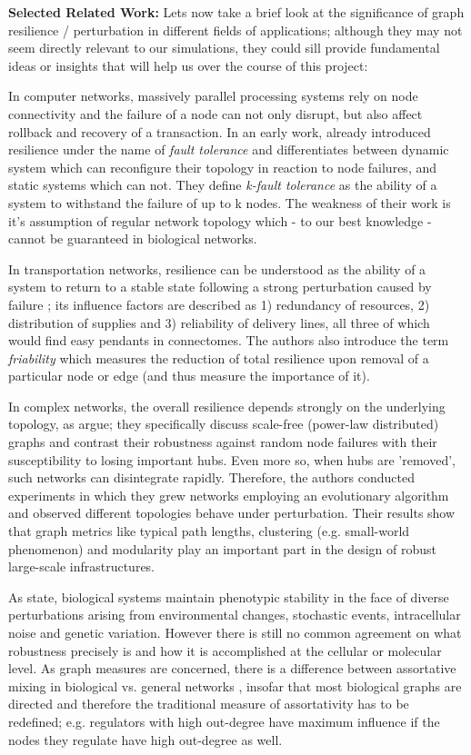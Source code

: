 \documentclass[a4paper,11pt]{article}
\begin{document}
\textbf{Selected Related Work:} Lets now take a brief look at the significance of graph resilience / perturbation in different fields of applications; although they may not seem directly relevant to our simulations, they could sill provide fundamental ideas or insights that will help us over the course of this project:

In computer networks, massively parallel processing systems rely on node connectivity and the failure of a node can not only disrupt, but also affect rollback and recovery of a transaction. In an early work, \citep{Gaudiot1990NetworkResilience} already introduced resilience under the name of \emph{fault tolerance} and differentiates between dynamic system which can reconfigure their topology in reaction to node failures, and static systems which can not. They define \emph{k-fault tolerance} as the ability of a system to withstand the failure of up to k nodes. The weakness of their work is it's assumption of regular network topology which - to our best knowledge - cannot be guaranteed in biological networks.

In transportation networks, resilience can be understood as the ability of a system to return to a stable state following a strong perturbation caused by failure \citep{Ip2011ResilienceTransportationNetworks}; its influence factors are described as 1) redundancy of resources, 2) distribution of supplies and 3) reliability of delivery lines, all three of which would find easy pendants in connectomes. The authors also introduce the term \emph{friability} which measures the reduction of total resilience upon removal of a particular node or edge (and thus measure the importance of it).

In complex networks, the overall resilience depends strongly on the underlying topology, as  \citep{Ash2007CascadingFailures} argue; they specifically discuss scale-free (power-law distributed) graphs and contrast their robustness against random node failures with their susceptibility to losing important hubs. Even more so, when hubs are 'removed', such networks can disintegrate rapidly. Therefore, the authors conducted experiments in which they grew networks employing an evolutionary algorithm and observed different topologies behave under perturbation. Their results show that graph metrics like typical path lengths, clustering (e.g. small-world phenomenon) and modularity play an important part in the design of robust large-scale infrastructures.

As \citep{Sauer2004CellularFunction} state, biological systems maintain phenotypic stability in the face of diverse perturbations arising from environmental changes, stochastic events, intracellular noise and genetic variation. However there is still no common agreement on what robustness precisely is and how it is accomplished at the cellular or molecular level. As graph measures are concerned, there is a difference between assortative mixing in biological vs. general networks \citep{Piraveenan2012AssortativeMixing}, insofar that most biological graphs are directed and therefore the traditional measure of assortativity has to be redefined; e.g. regulators with high out-degree have maximum influence if the nodes they regulate have high out-degree as well.
\end{document}
